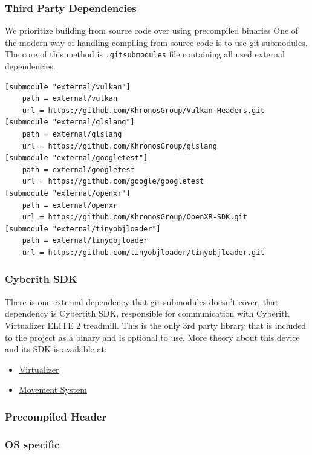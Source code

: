 \subsubsection{Third Party Dependencies}
\label{lst:3rdparty}
We prioritize building from source code over using precompiled binaries %
One of the modern way of handling compiling from source code is to use git submodules. The core of this method is \texttt{.gitsubmodules} file containing all used external dependencies.
\begin{lstlisting}[caption=.gitsubmodules]
[submodule "external/vulkan"]
	path = external/vulkan
	url = https://github.com/KhronosGroup/Vulkan-Headers.git
[submodule "external/glslang"]
	path = external/glslang
	url = https://github.com/KhronosGroup/glslang
[submodule "external/googletest"]
	path = external/googletest
	url = https://github.com/google/googletest
[submodule "external/openxr"]
	path = external/openxr
	url = https://github.com/KhronosGroup/OpenXR-SDK.git
[submodule "external/tinyobjloader"]
	path = external/tinyobjloader
	url = https://github.com/tinyobjloader/tinyobjloader.git
\end{lstlisting}

\newpage
\subsubsection{Cyberith SDK}
There is one external dependency that git submodules doesn't cover, that dependency is Cybertith SDK, responsible for communication with Cyberith Virtualizer ELITE 2 treadmill.
This is the only 3rd party library that is included to the project as a binary and is optional to use.
More theory about this device and its SDK is available at:
\begin{itemize}
    \item \hyperref[]{Virtualizer} %
    \item \hyperref[sec:movement_system]{Movement System}
\end{itemize}

\newpage
\subsubsection{Precompiled Header}

\newpage
\subsubsection{OS specific}
\label{sec:build_os}

